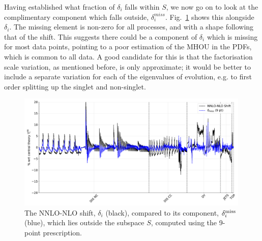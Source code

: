 Having established what fraction of $\delta_i$ falls within $S$, we now go on to look at the complimentary component which falls outside, $\delta_i^{miss}$. Fig.~\ref{fig:deltamiss} shows this alongside $\delta_i$. The missing element is non-zero for all processes, and with a shape following that of the shift. This suggests there could be a component of $\delta_i$ which is missing for most data points, pointing to a poor estimation of the MHOU in the PDFs, which is common to all data. A good candidate for this is that the factorisation scale variation, as mentioned before, is only approximate; it would be better to include a separate variation for each of the eigenvalues of evolution, e.g. to first order splitting up the singlet and non-singlet.
\begin{figure}[H]
  \begin{center}
    \includegraphics[width=0.99\textwidth]{mhous/plots/deltamiss_plot.pdf}
    \caption{The NNLO-NLO shift, $\delta_i$ (black), compared to its 
component, $\delta_i^{\rm miss}$ (blue), which lies outside the subspace $S$, computed using the 9-point prescription.}
    \label{fig:deltamiss}
  \end{center}
\end{figure}

